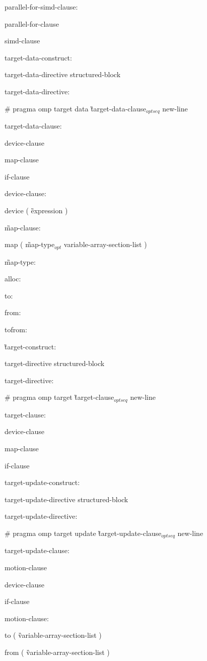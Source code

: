 {parallel-for-simd-clause:

\I parallel-for-clause

\I simd-clause

target-data-construct:

\I target-data-directive structured-block

target-data-directive:

\C\I \# pragma omp target data \G target-data-clause$_{optseq}$ new-line

target-data-clause:

\I device-clause

\I map-clause

\I if-clause

device-clause:

\C\I device ( \G expression \C )

\G map-clause:

\C\I map ( \G map-type$_{opt}$ variable-array-section-list \C )

\G map-type:

\C\I alloc:

\I to:

\I from:

\I tofrom:

\G target-construct:

\I target-directive structured-block

target-directive:

\C\I \# pragma omp target \G target-clause$_{optseq}$ new-line

target-clause:

\I device-clause

\I map-clause

\I if-clause

target-update-construct:

\I target-update-directive structured-block

target-update-directive:

\C\I \# pragma omp target update \G target-update-clause$_{optseq}$ new-line

target-update-clause:

\I motion-clause

\I device-clause

\I if-clause

motion-clause:

\C\I to ( \G variable-array-section-list \C )

\C\I from ( \G variable-array-section-list \C )

}
